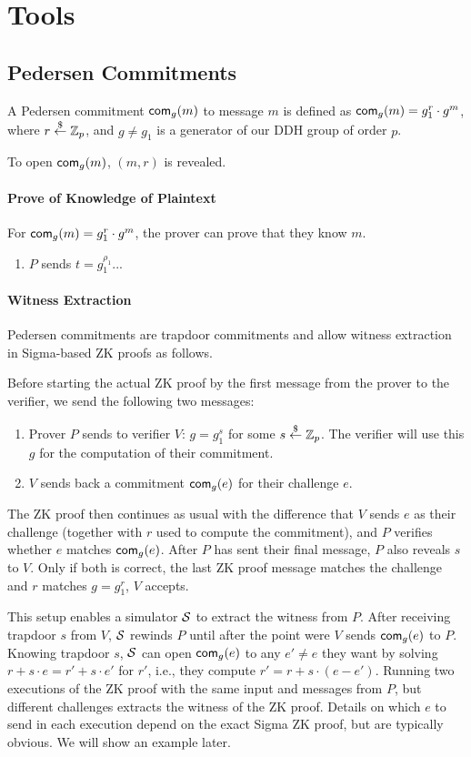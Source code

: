 \documentclass{article}
\begin{document}
\section{Tools}
\subsection{Pedersen Commitments}
A Pedersen commitment $\mathsf{com}_{g}(m)$ to message $m$ is defined as
$\mathsf{com}_{g}(m)=g_1^r\cdot{}g^m$, where $r\stackrel{\$}{\leftarrow}\mathbb{Z}_p$, and $g\neq{}g_1$ is
a generator of our DDH group of order $p$.

To open $\mathsf{com}_{g}(m)$, $(m,r)$ is revealed.

\paragraph{Prove of Knowledge of Plaintext}
For $\mathsf{com}_{g}(m)=g_1^r\cdot{}g^m$, the prover can prove that they know
$m$.
\begin{enumerate}
  \item $P$ sends $t=g_1^{\rho_1}$...
\end{enumerate}

\paragraph{Witness Extraction}
Pedersen commitments are trapdoor commitments and allow witness
extraction in Sigma-based ZK proofs as follows.

Before starting the actual ZK proof by the first message from the
prover to the verifier, we send the following two messages:
\begin{enumerate}
\item Prover $P$ sends to verifier $V$: $g=g_1^s$ for some
  $s\stackrel{\$}{\leftarrow}\mathbb{Z}_p$. The verifier will use this $g$ for the computation of
  their commitment.
  \item $V$ sends back a commitment $\mathsf{com}_g(e)$ for their challenge $e$.
\end{enumerate}

The ZK proof then continues as usual with the difference that $V$
sends $e$ as their challenge (together with $r$ used to compute
the commitment), and $P$ verifies whether $e$ matches $\mathsf{com}_g(e)$.
After $P$ has sent their final message, $P$ also reveals $s$ to
$V$. Only if both is correct, the last ZK proof message matches the
challenge and $r$ matches $g=g_1^r$, $V$ accepts.

This setup enables a simulator ${\mathcal{S}}$ to extract the witness from
$P$. After receiving trapdoor $s$ from $V$, ${\mathcal{S}}$ rewinds $P$ until
after the point were $V$ sends $\mathsf{com}_g(e)$ to $P$. Knowing trapdoor
$s$, ${\mathcal{S}}$ can open $\mathsf{com}_g(e)$ to any $e'\neq{}e$ they want by
solving $r+s\cdot{}e=r'+s\cdot{}e'$ for $r'$, i.e., they compute
$r'=r+s\cdot{}(e-e')$. Running two executions of the ZK proof with the
same input and messages from $P$, but different challenges extracts
the witness of the ZK proof. Details on which $e$ to send in each
execution depend on the exact Sigma ZK proof, but are typically
obvious. We will show an example later.
\end{document}

